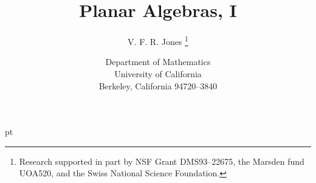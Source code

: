\documentclass[12pt]{article}
\title{Planar Algebras, I}
\author{V. F. R. Jones
\thanks{Research supported in part by NSF Grant DMS93--22675, the Marsden fund
UOA520, and the Swiss National Science Foundation.}
}
\date{Department of Mathematics\\University of
    California\\Berkeley, California 94720--3840}
\begin{document}
\maketitle


\def\op#1{\bf\rm{#1}} %


\def\qed{{\unskip\nobreak\hfil\penalty50\hskip2em\vadjust{}\nobreak\hfil
    $\square$\parfillskip=0pt\finalhyphendemerits=0\par}}

\def\normalbaselines{\baselineskip20pt
  \lineskip3pt \lineskiplimit3pt }
\def\eqdef#1{\smash{\mathop{=}\limits^{#1}}} 
             
        \newcommand\x{\times}
        \def\<{\langle}
        \def\>{\rangle}
        \renewcommand\a{\alpha}
        \renewcommand\b{{\cal B}}
        \newcommand\bs{\bigskip}
        \newcommand\dt{\cdot}
        \renewcommand\d{\delta} 
        \newcommand\D{\Delta}
        \newcommand\e{\varepsilon}
        \newcommand\g{\gamma} 
        \newcommand\G{\Gamma}
        \newcommand\J{{\cal J}} 
        \renewcommand\l{\lambda} 
        \renewcommand\L{\Lambda}
        \renewcommand\ni{\noindent}
        \newcommand\var{\varphi}
        \renewcommand\r{\mathbb R^2}
        \newcommand\s{\sigma}
        \renewcommand\th{\theta}
        \renewcommand\O{\Omega}
        \renewcommand\o{\omega}  
        \newcommand\z{\mathbb Z}
        \renewcommand\i{\infty}
        \newcommand\p{\partial}
        \def\text#1{\scriptstyle{\rm #1}}       
        \renewcommand\P{{\cal P}}

 pt











\end{document}
